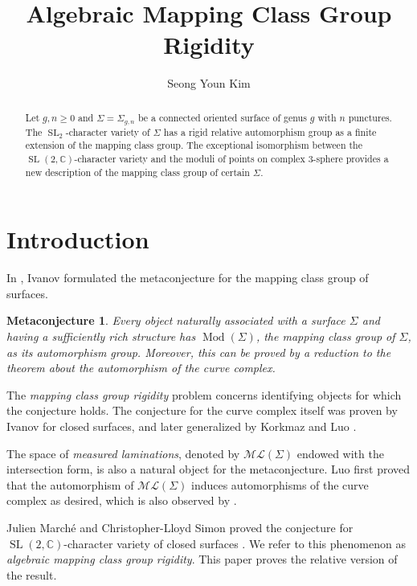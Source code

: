 \documentclass[11pt]{amsart}
\title{Algebraic Mapping Class Group Rigidity}
\author{Seong Youn Kim}
\numberwithin{theorem}{section}
\newtheorem*{metaconjecture}{Metaconjecture}
\theoremstyle{definition}
\theoremstyle{remark}
\newcommand{\C}{{\mathbb{C}}}
\DeclareMathOperator{\Mod}{Mod}
\DeclareMathOperator{\SL}{SL}
\newcommand{\<}{\langle}
\renewcommand{\>}{\rangle}
\begin{document}
\maketitle

\begin{abstract}
Let $g, n \geq 0$ and $\Sigma = \Sigma_{g, n}$ be a connected oriented surface of genus $g$ with $n$ punctures. The $\SL_2$-character variety of $\Sigma$ has a rigid relative automorphism group as a finite extension of the mapping class group. The exceptional isomorphism between the $\SL(2, \C)$-character variety and the moduli of points on complex $3$-sphere provides a new description of the mapping class group of certain $\Sigma$. 
\end{abstract}

\section{Introduction}

In \cite{ivanov2006fifteen}, Ivanov formulated the metaconjecture for the mapping class group of surfaces.

\begin{metaconjecture}
    Every object naturally associated with a surface $\Sigma$ and having a sufficiently rich structure has $\Mod(\Sigma)$, the mapping class group of $\Sigma$, as its automorphism group. Moreover, this can be proved by a reduction to the theorem about the automorphism of the curve complex.
\end{metaconjecture}

The \textit{mapping class group rigidity} problem concerns identifying objects for which the conjecture holds. The conjecture for the curve complex itself was proven by Ivanov for closed surfaces, and later generalized by Korkmaz and Luo \cite{ivanov1997automorphisms, korkmaz1999automorphisms, luo1999automorphisms}.

The space of \textit{measured laminations}, denoted by $\mathcal{ML}(\Sigma)$ endowed with the intersection form, is also a natural object for the metaconjecture. Luo \cite{luo1999automorphisms} first proved that the automorphism of $\mathcal{ML}(\Sigma)$ induces automorphisms of the curve complex as desired, which is also observed by \cite{ohshika2018homeomorphismes, jyothis2023towards}.

Julien March\'e and Christopher-Lloyd Simon proved the conjecture for $\SL(2, \C)$-character variety of closed surfaces \cite{marche2021automorphisms}. We refer to this phenomenon as \textit{algebraic mapping class group rigidity}. This paper proves the relative version of the result.
\end{document}
